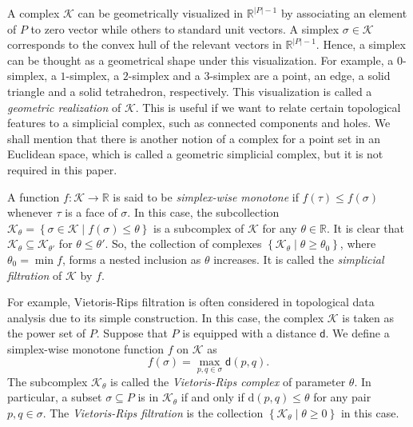 \documentclass[sn-mathphys-num]{sn-jnl}%
\theoremstyle{thmstyleone}%
\theoremstyle{thmstyletwo}%
\theoremstyle{thmstylethree}%
\begin{document}
A complex $\mathcal{K}$ can be geometrically visualized in $\mathbb{R}^{|P|-1}$ by associating an element of $P$ to zero vector while others to standard unit vectors. A simplex $\sigma \in $$\mathcal{K}$ corresponds to the convex hull of the relevant vectors in $\mathbb{R}^{|P|-1}$. Hence, a simplex can be thought as a geometrical shape under this visualization. For example, a $0$-simplex, a $1$-simplex, a $2$-simplex and a $3$-simplex are a point, an edge, a solid triangle and a solid tetrahedron, respectively. This visualization is called a \emph{geometric realization} of $\mathcal{K}$. This is useful if we want to relate certain topological features to a simplicial complex, such as connected components and holes. We shall mention that there is another notion of a complex for a point set in an Euclidean space, which is called a geometric simplicial complex, but it is not required in this paper.

A function $f:\mathcal{K} \rightarrow \mathbb{R}$ is said to be \emph{simplex-wise monotone} if $f(\tau) \leq f(\sigma)$ whenever $\tau$ is a face of $\sigma$. In this case, the subcollection $\mathcal{K}_\theta = \left\{\sigma \in \mathcal{K} \mid f(\sigma) \leq \theta\right\}$ is a subcomplex of $\mathcal{K}$ for any $\theta \in \mathbb{R}$. It is clear that $\mathcal{K}_\theta \subseteq \mathcal{K}_{\theta'}$ for $\theta \leq \theta'$. So, the collection of complexes $\left\{\mathcal{K}_\theta \mid \theta \geq \theta_0\right\}$, where $\theta_0 = \min f$, forms a nested inclusion as $\theta$ increases. It is called the \emph{simplicial filtration} of $\mathcal{K}$ by $f$.

For example, Vietoris-Rips filtration is often considered in topological data analysis due to its simple construction. In this case, the complex $\mathcal{K}$ is taken as the power set of $P$. Suppose that $P$ is equipped with a distance $\mathsf{d}$. We define a simplex-wise monotone function $f$ on $\mathcal{K}$ as
\begin{equation*}
	f(\sigma)=\max _{p, q \in \sigma} \mathsf{d}(p, q).
\end{equation*}
The subcomplex $\mathcal{K}_\theta$ is called the \emph{Vietoris-Rips complex} of parameter $\theta$. In particular, a subset $\sigma \subseteq P$ is in $\mathcal{K}_\theta$ if and only if $\mathrm{d}(p, q) \leq \theta$ for any pair $p, q \in \sigma$. The \emph{Vietoris-Rips filtration} is the collection $\left\{\mathcal{K}_\theta \mid \theta \geq 0\right\}$ in this case.
\end{document}
